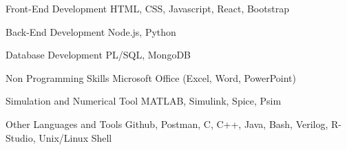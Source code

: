 \newcommand{\Csh}{C{\lserif\#}}



\begin{cvskills}




\cvskill
{Front-End Development} %
{HTML, CSS, Javascript, React, Bootstrap} %


\cvskill
{Back-End Development} %
{Node.js, Python} %


\cvskill
{Database Development} %
{PL/SQL, MongoDB} %


\cvskill
{Non Programming Skills} %
{Microsoft Office (Excel, Word, PowerPoint)} %






\cvskill
{Simulation and Numerical Tool} %
{MATLAB, Simulink, Spice, Psim} %


\cvskill
{Other Languages and Tools} %
{Github, Postman, C, C++, Java, Bash, Verilog, R-Studio, Unix/Linux Shell} %


\end{cvskills}